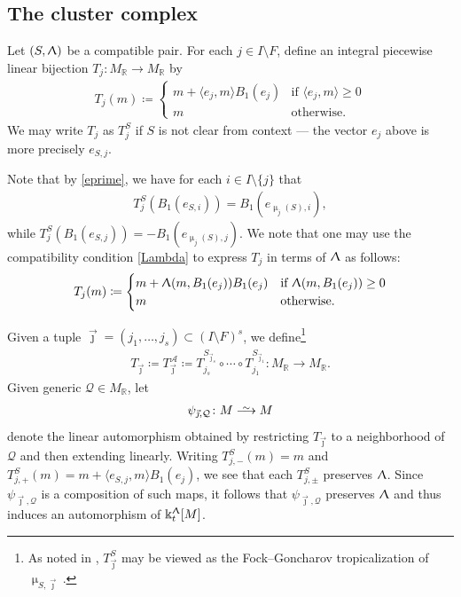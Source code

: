 \documentclass{amsart}
\let\bb=\mathbb
\let\rar=\rightarrow
\let\s=\mathcal
\def\risom{\buildrel\sim\over{\smashedlongrightarrow}}
\def\smashedlongrightarrow{\setbox0=\hbox{$\longrightarrow$}\ht0=1.25pt\box0}
\newcommand {\kk} {\Bbbk}
\newcommand {\sQ} {\mathcal{Q}}
\newcommand {\jj} {\vec{\jmath}}
\renewcommand{\Lambda}{\Uplambda}
\renewcommand{\mu}{\upmu}
\theoremstyle{plain}%
\theoremstyle{definition}
\theoremstyle{remark}
\begin{document}
\subsection{The cluster complex}\label{ChamberSection}


Let $(S,\Lambda)$ be a compatible pair.  For each $j\in I\setminus F$, define an integral piecewise linear bijection $T_j\colon M_{\bb{R}}\rar M_{\bb{R}}$ by
\begin{align}\label{Tj}
    T_j(m)\coloneqq 
    \begin{cases} m+\langle e_j,m\rangle B_{1}(e_j) & \mbox{if $\langle e_j,m\rangle \geq 0$} \\ m & \mbox{otherwise.}
    \end{cases}
\end{align}
We may write $T_j$ as $T_j^S$ if $S$ is not clear from context --- the vector $e_j$ above is more precisely $e_{S,j}$.

Note that by \eqref{eprime}, we have for each $i\in I\setminus \{j\}$ that
\begin{align}\label{Tkei}
    T_j^S(B_1(e_{S,i}))=B_1(e_{\mu_j(S),i}),
\end{align}
while $T_j^S(B_1(e_{S,j}))=-B_1(e_{\mu_j(S),j})$.  We note that one may use the compatibility condition \eqref{Lambda} to express $T_j$ in terms of $\Lambda$ as follows:
\begin{align*}
    T_j(m)\coloneqq 
    \begin{cases} m+\Lambda(m,B_1(e_j)) B_{1}(e_j) & \mbox{if $\Lambda(m,B_1(e_j)) \geq 0$} \\ m & \mbox{otherwise.}
    \end{cases}
\end{align*}


Given a tuple $\jj=(j_1,\ldots,j_s)\subset (I\setminus F)^s$, we define\footnote{As noted in \cite[Prop. 2.4]{GHKK}, $T^S_{\jj}$ may be viewed as the Fock--Goncharov tropicalization of $\mu_{S,\jj}$.} 
\begin{align}\label{mujj}
T_{\jj}\coloneqq T_{\jj}^{\s{A}}\coloneqq T^{S_{\jj_s}}_{j_s}\circ \cdots \circ T^{S_{\jj_1}}_{j_1}\colon M_{\bb{R}}\rar M_{\bb{R}}.
\end{align}
Given generic $\sQ\in M_{\bb{R}}$, let 
\begin{align}\label{psijQ}
    \psi_{\jj,\sQ}\colon M\risom M
\end{align} denote the linear automorphism obtained by restricting $T_{\jj}$ to a neighborhood of $\sQ$ and then extending linearly.  Writing $T^S_{j,-}(m)=m$ and $T^S_{j,+}(m)=m+\langle e_{S,j},m\rangle B_1(e_j)$, we see that each $T^{S}_{j,\pm}$ preserves $\Lambda$.  Since $\psi_{\jj,\sQ}$ is a composition of such maps, it follows that $\psi_{\jj,\sQ}$ preserves $\Lambda$ and thus induces an automorphism of $\kk_t^{\Lambda}[M]$.
\end{document}
